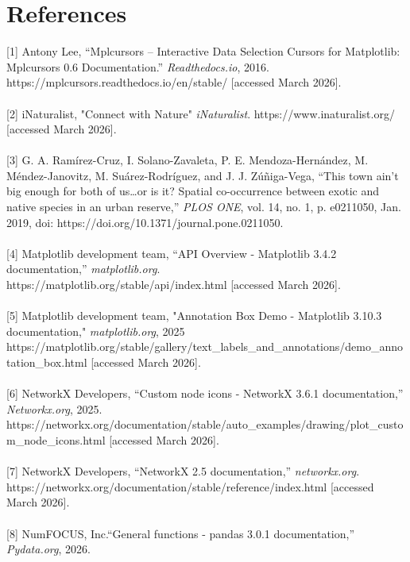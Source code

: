 \documentclass{article}
\begin{document}
\section{References}
‌[1] Antony Lee, “Mplcursors – Interactive Data Selection Cursors for Matplotlib: Mplcursors 0.6 Documentation.”  
\textit{Readthedocs.io}, 2016.
https://mplcursors.readthedocs.io/en/stable/ [accessed March 2026]. \\ \\
‌[2] iNaturalist, "Connect with Nature" \textit{iNaturalist}. https://www.inaturalist.org/ [accessed March 2026]. \\ \\
‌[3] G. A. Ramírez-Cruz, I. Solano-Zavaleta, P. E. Mendoza-Hernández, M. Méndez-Janovitz, M. Suárez-Rodríguez, and J. J. Zúñiga-Vega, “This town ain’t big enough for both of us…or is it? Spatial co-occurrence between exotic and native species in an urban reserve,” \textit{PLOS ONE}, vol. 14, no. 1, p. e0211050, Jan. 2019, doi: https://doi.org/10.1371/journal.pone.0211050. \\ \\
‌[4] Matplotlib development team, “API Overview - Matplotlib 3.4.2 documentation,” \textit{matplotlib.org}. \\ https://matplotlib.org/stable/api/index.html [accessed March 2026]. \\ \\
‌[5] Matplotlib development team, "Annotation Box Demo - Matplotlib 3.10.3 documentation," \textit{matplotlib.org}, 2025 \\ 
https://matplotlib.org/stable/gallery/text\_labels\_and\_annotations/demo\_annotation\_box.html [accessed March 2026]. \\ \\
‌[6] NetworkX Developers, “Custom node icons - NetworkX 3.6.1 documentation,” \textit{Networkx.org}, 2025. \\
https://networkx.org/documentation/stable/auto\_examples/drawing/plot\_custom\_node\_icons.html [accessed March 2026]. \\ \\
‌[7] NetworkX Developers, “NetworkX 2.5 documentation,” \textit{networkx.org}. \\ https://networkx.org/documentation/stable/reference/index.html [accessed March 2026]. \\ \\
‌[8] NumFOCUS, Inc.“General functions - pandas 3.0.1 documentation,” \textit{Pydata.org}, 2026. \\
\end{document}
